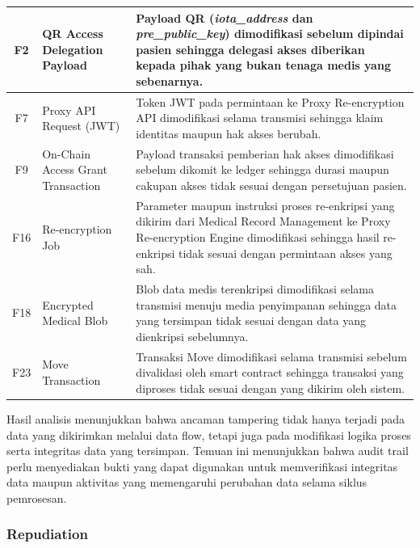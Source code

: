 \begin{xltabular}{\textwidth}{|c|>{\raggedright\arraybackslash}p{3.2cm}|X|}
    F2 &
    QR Access Delegation Payload &
    Payload QR (\textit{iota\_address} dan \textit{pre\_public\_key}) dimodifikasi sebelum dipindai pasien sehingga delegasi akses diberikan kepada pihak yang bukan tenaga medis yang sebenarnya. \\
    \hline

    F7 &
    Proxy API Request (JWT) &
    Token JWT pada permintaan ke Proxy Re-encryption API dimodifikasi selama transmisi sehingga klaim identitas maupun hak akses berubah. \\
    \hline

    F9 &
    On-Chain Access Grant Transaction &
    Payload transaksi pemberian hak akses dimodifikasi sebelum dikomit ke ledger sehingga durasi maupun cakupan akses tidak sesuai dengan persetujuan pasien. \\
    \hline

    F16 &
    Re-encryption Job &
    Parameter maupun instruksi proses re-enkripsi yang dikirim dari Medical Record Management ke Proxy Re-encryption Engine dimodifikasi sehingga hasil re-enkripsi tidak sesuai dengan permintaan akses yang sah. \\
    \hline

    F18 &
    Encrypted Medical Blob &
    Blob data medis terenkripsi dimodifikasi selama transmisi menuju media penyimpanan sehingga data yang tersimpan tidak sesuai dengan data yang dienkripsi sebelumnya. \\
    \hline

    F23 &
    Move Transaction &
    Transaksi Move dimodifikasi selama transmisi sebelum divalidasi oleh smart contract sehingga transaksi yang diproses tidak sesuai dengan yang dikirim oleh sistem. \\
    \hline

\end{xltabular}

Hasil analisis menunjukkan bahwa ancaman tampering tidak hanya terjadi pada data yang dikirimkan melalui data flow, tetapi juga pada modifikasi logika proses serta integritas data yang tersimpan. Temuan ini menunjukkan bahwa audit trail perlu menyediakan bukti yang dapat digunakan untuk memverifikasi integritas data maupun aktivitas yang memengaruhi perubahan data selama siklus pemrosesan.

\subsubsection{Repudiation}

